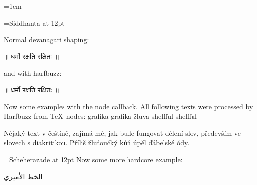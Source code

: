 \documentclass{article}
\begin{document}
\parindent=0pt
\parskip=1em
%  

\frenchspacing %

\font\siddhanta={Siddhanta} at 12pt
\bigskip

\siddhanta 

Normal devanagari shaping: 

॥ धर्मो रक्षति रक्षितः ॥

\startharfbuzz

and with harfbuzz: 


॥ धर्मो रक्षति रक्षितः ॥

\ahoj


Now some examples with the node callback. All following texts were processed by
Harfbuzz from TeX\ nodes: grafika graf\/ika žluva shelfful shelf\/ful


Nějaký text v češtině, zajímá mě, jak bude fungovat dělení slov, především ve
slovech s diakritikou. Příliš žluťoučký kůň úpěl ďábelské ódy. 


\font\amiri={Scheherazade} at 12pt
\amiri
Now some more hardcore example:


الخط الأميري
\end{document}

